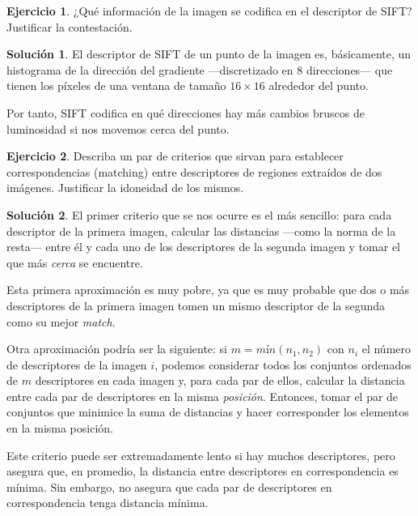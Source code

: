\documentclass[a4paper, 11pt]{article}
\theoremstyle{definition}
\newtheorem{ejercicio}{Ejercicio}
\newtheorem*{solucion}{Solución}
\theoremstyle{theorem}
\begin{document}
  \begin{ejercicio}
      ¿Qué información de la imagen se codifica en el descriptor de SIFT? Justificar la contestación.
  \end{ejercicio}

  \begin{solucion}
      El descriptor de SIFT de un punto de la imagen es, básicamente, un histograma de la dirección del gradiente ---discretizado en 8 direcciones--- que tienen los píxeles de una ventana de tamaño $16\times16$ alrededor del punto.

      Por tanto, SIFT codifica en qué direcciones hay más cambios bruscos de luminosidad si nos movemos cerca del punto.
  \end{solucion}

  \begin{ejercicio}
      Describa un par de criterios que sirvan para establecer correspondencias (matching) entre descriptores de regiones extraídos de dos imágenes. Justificar la idoneidad de los mismos.
  \end{ejercicio}

  \begin{solucion}
      El primer criterio que se nos ocurre es el más sencillo: para cada descriptor de la primera imagen, calcular las distancias ---como la norma de la resta--- entre él y cada uno de los descriptores de la segunda imagen y tomar el que más \emph{cerca} se encuentre.

      Esta primera aproximación es muy pobre, ya que es muy probable que dos o más descriptores de la primera imagen tomen un mismo descriptor de la segunda como su mejor \emph{match}.

      Otra aproximación podría ser la siguiente: si $m = mín(n_1,n_2)$ con $n_i$ el número de descriptores de la imagen $i$, podemos considerar todos los conjuntos ordenados de $m$ descriptores en cada imagen y, para cada par de ellos, calcular la distancia entre cada par de descriptores en la misma \emph{posición}. Entonces, tomar el par de conjuntos que minimice la suma de distancias y hacer corresponder los elementos en la misma posición.

      Este criterio puede ser extremadamente lento si hay muchos descriptores, pero asegura que, en promedio, la distancia entre descriptores en correspondencia es mínima. Sin embargo, no asegura que cada par de descriptores en correspondencia tenga distancia mínima.
  \end{solucion}
\end{document}
